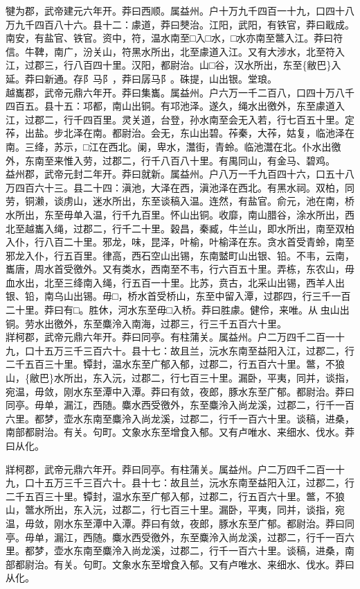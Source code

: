 \documentclass[]{article}
\begin{document}
犍为郡，武帝建元六年开。莽曰西顺。属益州。户十万九千四百一十九，口四十八万九千四百八十六。县十二：豦道，莽曰僰治。江阳，武阳，有铁官，莽曰戢成。南安，有盐官、铁官。资中，符，温水南至□入□水，□水亦南至鄨入江。莽曰符信。牛鞞，南广，汾关山，符黑水所出，北至豦道入江。又有大涉水，北至符入江，过郡三，行八百四十里。汉阳，都尉治。山□谷，汉水所出，东至\{敝巴\}入延。莽曰新通。存阝马阝，莽曰孱马阝。硃提，山出银。堂琅。\\
越巂郡，武帝元鼎六年开。莽曰集巂。属益州。户六万一千二百八，口四十万八千四百五。县十五：邛都，南山出铜。有邛池泽。遂久，绳水出徼外，东至豦道入江，过郡二，行千四百里。灵关道，台登，孙水南至会无入若，行七百五十里。定莋，出盐。步北泽在南。都尉治。会无，东山出碧。莋秦，大莋，姑复，临池泽在南。三绛，苏示，□江在西北。阑，卑水，灊街，青蛉。临池灊在北。仆水出徼外，东南至来惟入劳，过郡二，行千八百八十里。有禺同山，有金马、碧鸡。\\
益州郡，武帝元封二年开。莽曰就新。属益州。户八万一千九百四十六，口五十八万四百六十三。县二十四：滇池，大泽在西，滇池泽在西北。有黑水祠。双柏，同劳，铜濑，谈虏山，迷水所出，东至谈稿入温。连然，有盐官。俞元，池在南，桥水所出，东至毋单入温，行千九百里。怀山出铜。收靡，南山腊谷，涂水所出，西北至越巂入绳，过郡二，行千二十里。穀昌，秦臧，牛兰山，即水所出，南至双柏入仆，行八百二十里。邪龙，味，昆泽，叶榆，叶榆泽在东。贪水首受青蛉，南至邪龙入仆，行五百里。律高，西石空山出锡，东南盢町山出银、铅。不韦，云南，巂唐，周水首受徼外。又有类水，西南至不韦，行六百五十里。弄栋，东农山，毋血水出，北至三绛南入绳，行五百一十里。比苏，贲古，北采山出锡，西羊人出银、铅，南乌山出锡。毋□，桥水首受桥山，东至中留入潭，过郡四，行三千一百二十里。莽曰有□。胜休，河水东至毋□入桥。莽曰胜豦。健伶，来唯。从虫山出铜。劳水出徼外，东至麋泠入南海，过郡三，行三千五百六十里。\\
牂柯郡，武帝元鼎六年开。莽曰同亭。有柱蒲关。属益州。户二万四千二百一十九，口十五万三千三百六十。县十七：故且兰，沅水东南至益阳入江，过郡二，行二千五百三十里。镡封，温水东至广郁入郁，过郡二，行五百六十里。鄨，不狼山，\{敝巴\}水所出，东入沅，过郡二，行七百三十里。漏卧，平夷，同并，谈指，宛温，毋敛，刚水东至潭中入潭。莽曰有敛，夜郎，豚水东至广郁。都尉治。莽曰同亭。毋单，漏江，西随。麋水西受徼外，东至麋泠入尚龙溪，过郡二，行千一百六里。都梦，壶水东南至麋泠入尚龙溪，过郡二，行千一百六十里。谈稿，进桑，南部都尉治。有关。句町。文象水东至增食入郁。又有卢唯水、来细水、伐水。莽曰从化。

牂柯郡，武帝元鼎六年开。莽曰同亭。有柱蒲关。属益州。户二万四千二百一十九，口十五万三千三百六十。县十七：故且兰，沅水东南至益阳入江，过郡二，行二千五百三十里。镡封，温水东至广郁入郁，过郡二，行五百六十里。鄨，不狼山，鄨水所出，东入沅，过郡二，行七百三十里。漏卧，平夷，同并，谈指，宛温，毋敛，刚水东至潭中入潭。莽曰有敛，夜郎，豚水东至广郁。都尉治。莽曰同亭。毋单，漏江，西随。麋水西受徼外，东至麋泠入尚龙溪，过郡二，行千一百六里。都梦，壶水东南至麋泠入尚龙溪，过郡二，行千一百六十里。谈稿，进桑，南部都尉治。有关。句町。文象水东至增食入郁。又有卢唯水、来细水、伐水。莽曰从化。
\end{document}
